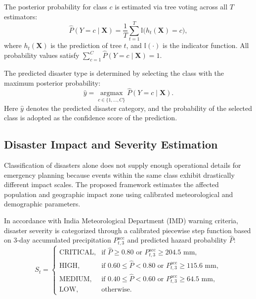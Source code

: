 \documentclass[conference]{IEEEtran}
\begin{document}
The posterior probability for class $c$ is estimated via tree voting across all $T$ estimators:
\begin{equation}
\hat{P}(Y = c \mid \mathbf{X}) = \frac{1}{T} \sum_{t=1}^T \mathbb{I}\big( h_t(\mathbf{X}) = c \big),
\label{eq:rf_prob}
\end{equation}
where $h_t(\mathbf{X})$ is the prediction of tree $t$, and $\mathbb{I}(\cdot)$ is the indicator function. All probability values satisfy $\sum_{c=1}^C \hat{P}(Y = c \mid \mathbf{X}) = 1$.

The predicted disaster type is determined by selecting the class with the maximum posterior probability:
\begin{equation}
\hat{y} = \operatorname*{argmax}_{c \in \{1, \dots, C\}} \hat{P}(Y = c \mid \mathbf{X}).
\label{eq:argmax}
\end{equation}
Here $\hat{y}$ denotes the predicted disaster category, and the probability of the selected class is adopted as the confidence score of the prediction.

\subsection{Disaster Impact and Severity Estimation}
Classification of disasters alone does not supply enough operational details for emergency planning because events within the same class exhibit drastically different impact scales. The proposed framework estimates the affected population and geographic impact zone using calibrated meteorological and demographic parameters.

In accordance with India Meteorological Department (IMD) warning criteria, disaster severity is categorized through a calibrated piecewise step function based on 3-day accumulated precipitation $P^{\text{acc}}_{t,3}$ and predicted hazard probability $\hat{P}$:
\begin{equation}
S_t = \begin{cases}
\text{CRITICAL}, & \text{if } \hat{P} \ge 0.80 \text{ or } P^{\text{acc}}_{t,3} \ge 204.5\text{ mm}, \\
\text{HIGH},     & \text{if } 0.60 \le \hat{P} < 0.80 \text{ or } P^{\text{acc}}_{t,3} \ge 115.6\text{ mm}, \\
\text{MEDIUM},   & \text{if } 0.40 \le \hat{P} < 0.60 \text{ or } P^{\text{acc}}_{t,3} \ge 64.5\text{ mm}, \\
\text{LOW},      & \text{otherwise}.
\end{cases}
\label{eq:severity_levels}
\end{equation}
\end{document}
